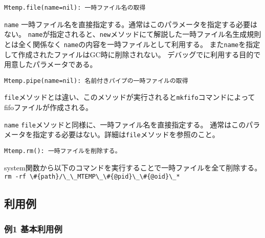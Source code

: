 \documentclass[a4paper]{jarticle}
\begin{document}
{\large\color{blue}
\begin{verbatim}
Mtemp.file(name=nil): 一時ファイル名の取得
\end{verbatim}
}
\begin{description}
	\setlength{\itemindent}{-5mm}
	\item {\large \verb/name/} 一時ファイル名を直接指定する。通常はこのパラメータを指定する必要はない。
\verb/name/が指定されると、\verb/new/メソッドにて解説した一時ファイル名生成規則とは全く関係なく
\verb/name/の内容を一時ファイルとして利用する。
また\verb|name|を指定して作成されたファイルはGC時に削除されない。
デバッグでに利用する目的で用意したパラメータである。
\end{description}

{\large\color{blue}
\begin{verbatim}
Mtemp.pipe(name=nil): 名前付きパイプの一時ファイルの取得
\end{verbatim}
}
\verb|file|メソッドとは違い、このメソッドが実行されると\verb|mkfifo|コマンドによってfifoファイルが作成される。

\begin{description}
	\setlength{\itemindent}{-5mm}
	\item {\large \verb/name/} \verb|file|メソッドと同様に、一時ファイル名を直接指定する。
通常はこのパラメータを指定する必要はない。詳細は\verb|file|メソッドを参照のこと。
\end{description}

{\large\color{blue}
\begin{verbatim}
Mtemp.rm(): 一時ファイルを削除する。
\end{verbatim}
}

system関数から以下のコマンドを実行することで一時ファイルを全て削除する。
\verb |rm -rf \#{path}/\_\_MTEMP\_\#{@pid}\_\#{@oid}\_*|


\subsection*{利用例}

\subsubsection*{例1 基本利用例}
\end{document}
